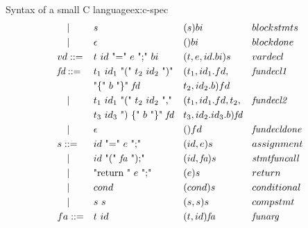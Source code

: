 \begin{example}{Syntax of a small C language}{ex:c-spec}
\[\begin{aligned}
       & \quad |         &  & \text{$s$}                                             &  & (s)bi                         &  & blockstmts           \\
       & \quad |         &  & \epsilon                                               &  & ()bi                          &  & blockdone            \\
       & vd ::=          &  & \text{$t$ $id$ "=" $e$ ";" $bi$}                       &  & (t,e,id.bi)s                  &  & vardecl              \\
       & \textit{fd} ::= &  & \text{$t_1$ $id_1$ "(" $t_2$ $id_2$ ")"}               &  & (t_1,id_1.fd,                 &  & \textit{fundecl1}    \\
       &                 &  & \text{"\{" $b$ "\}" \textit{fd}}                       &  & t_2,id_2.b)fd                                           \\
       & \quad |         &  & \text{$t_1$ $id_1$ "(" $t_2$ $id_2$ ","}               &  & (t_1,id_1.fd,t_2,             &  & \textit{fundecl2}    \\
       &                 &  & \text{$t_3$ $id_3$ ") \{" $b$ "\}" $\textit{fd}$}      &  & t_3,id_2.id_3.b)\textit{fd}                             \\
       & \quad |         &  & \text{$\epsilon$}                                      &  & ()fd                          &  & \textit{fundecldone} \\
       & s ::=           &  & \text{$id$ "=" $e$ ";"}                                &  & (id,e)s                       &  & assignment           \\
       & \quad |         &  & \text{$id$ "(" \textit{fa} ");"}                       &  & (id,\textit{fa})s             &  & \textit{stmtfuncall} \\
       & \quad |         &  & \text{"return " $e$ ";"}                               &  & (e)s                          &  & return               \\
       & \quad |         &  & \text{$cond$}                                          &  & (cond)s                       &  & conditional          \\
       & \quad |         &  & \text{$s$ $s$}                                         &  & (s,s)s                        &  & compstmt             \\
       & fa ::=          &  & \text{$t$ $id$}                                        &  & (t,id)\textit{fa}             &  & \textit{funarg}      \\

\end{aligned}\]
\end{example}
